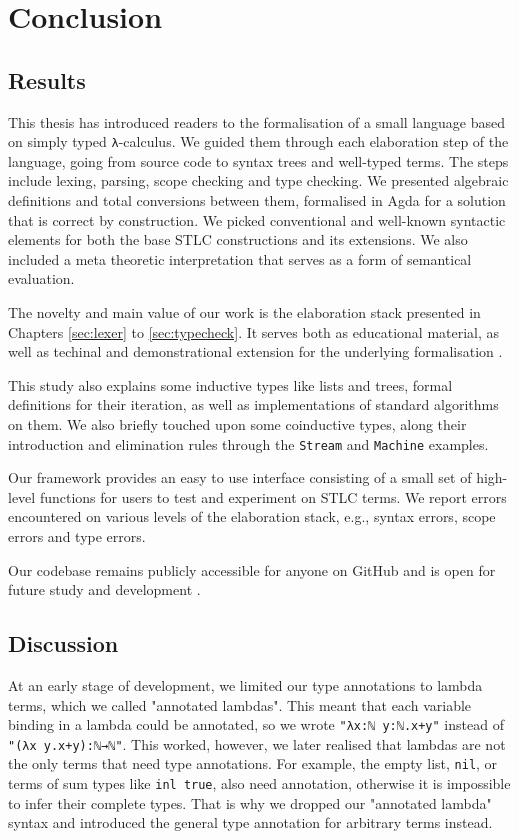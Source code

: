 \chapter{Conclusion}
\label{ch:conclusion}

\section{Results}

This thesis has introduced readers to the formalisation of a small language based on simply typed \verb$λ$-calculus. We guided them through each elaboration step of the language, going from source code to syntax trees and well-typed terms. The steps include lexing, parsing, scope checking and type checking. We presented algebraic definitions and total conversions between them, formalised in Agda for a solution that is correct by construction. We picked conventional and well-known syntactic elements for both the base STLC constructions and its extensions. We also included a meta theoretic interpretation that serves as a form of semantical evaluation.

The novelty and main value of our work is the elaboration stack presented in Chapters \ref{sec:lexer} to \ref{sec:typecheck}. It serves both as educational material, as well as techinal and demonstrational extension for the underlying formalisation \cite{typesystems-repo}.

This study also explains some inductive types like lists and trees, formal definitions for their iteration, as well as implementations of standard algorithms on them. We also briefly touched upon some coinductive types, along their introduction and elimination rules through the \verb$Stream$ and \verb$Machine$ examples.

Our framework provides an easy to use interface consisting of a small set of high-level functions for users to test and experiment on STLC terms. We report errors encountered on various levels of the elaboration stack, e.g., syntax errors, scope errors and type errors.

Our codebase remains publicly accessible for anyone on GitHub and is open for future study and development \cite{home-repo}.

\section{Discussion}

At an early stage of development, we limited our type annotations to lambda terms, which we called "annotated lambdas". This meant that each variable binding in a lambda could be annotated, so we wrote \verb$"λx:ℕ y:ℕ.x+y"$ instead of \verb$"(λx y.x+y):ℕ→ℕ"$. This worked, however, we later realised that lambdas are not the only terms that need type annotations. For example, the empty list, \verb$nil$, or terms of sum types like \verb$inl true$, also need annotation, otherwise it is impossible to infer their complete types. That is why we dropped our "annotated lambda" syntax and introduced the general type annotation for arbitrary terms instead.

